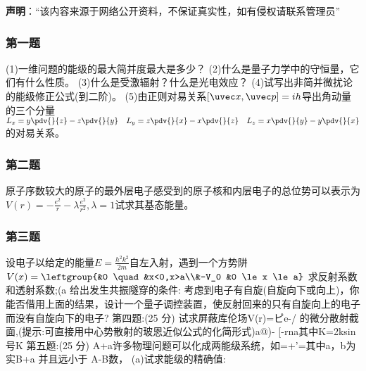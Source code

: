 


\textbf{声明}：“该内容来源于网络公开资料，不保证真实性，如有侵权请联系管理员”

\subsubsection{第一题}
(1)一维问题的能级的最大简并度最大是多少？
(2)什么是量子力学中的守恒量，它们有什么性质。
(3)什么是受激辐射？什么是光电效应？
(4)试写出非简并微扰论的能级修正公式(到二阶)。
(5)由正则对易关系$[\uvec x,\uvec p]=ih$导出角动量的三个分量$\displaystyle L_x=y\pdv{}{z}-z\pdv{}{y}  \quad L_y=z\pdv{}{x}-x\pdv{}{z} \quad L_z=x\pdv{}{y}-y\pdv{}{x}$
的对易关系。
\subsubsection{第二题}
原子序数较大的原子的最外层电子感受到的原子核和内层电子的总位势可以表示为$\displaystyle V(r)=-\frac{e^2}{r}-\lambda\frac{e^2}{r^2},\lambda=1$试求其基态能量。
\subsubsection{第三题}
设电子以给定的能量$E=\frac{h^2k^2}{2m}$自左入射，遇到一个方势阱$V(x)=\leftgroup{&0 \quad &x<0,x>a\\&-V_0 &0 \le x \le a}$
求反射系数和透射系数;(a
给出发生共振隧穿的条件:
考虑到电子有自旋(自旋向下或向上)，你能否借用上面的结果，设计一个量子调控装置，使反射回来的只有自旋向上的电子而没有自旋向下的电子?
第四题:(25 分)
试求屏蔽库伦场V(r)=ピe-/ 的微分散射截面,(提示:可直接用中心势散射的玻恩近似公式的化简形式)a@)- [-rna其中K=2ksin号K
第五题:(25 分)
A+a许多物理问题可以化成两能级系统，如=+'=其中a，b为实B+a
并且远小于 A-B数，
(a)试求能级的精确值: